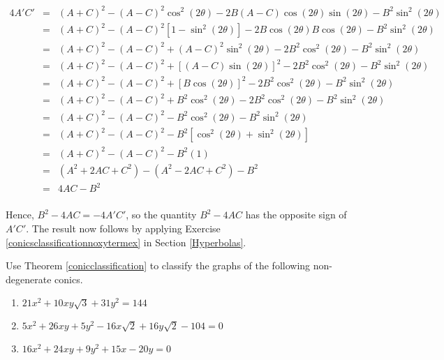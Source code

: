 \documentclass{ximera}
\begin{document}
{\[\begin{array}{rcl}
4A'C' & = & (A+C)^2 - (A-C)^2 \cos^{2}(2\theta) -2B(A-C)\cos(2\theta)\sin(2\theta) -B^2\sin^2(2\theta) \\ [3pt]
      & = & (A+C)^2 - (A-C)^2 \left[ 1-\sin^{2}(2\theta)\right] -2B\cos(2\theta) B \cos(2\theta) -B^2\sin^2(2\theta) \\ [3pt]
      & = & (A+C)^2 - (A-C)^2  + (A-C)^2 \sin^{2}(2\theta) -2B^2\cos^{2}(2\theta) -B^2\sin^2(2\theta) \\ [3pt]   
      & = & (A+C)^2 - (A-C)^2  +\left[(A-C) \sin(2\theta)\right]^2 -2B^2\cos^{2}(2\theta) -B^2\sin^2(2\theta)  \\ [3pt]    
      & = & (A+C)^2 - (A-C)^2  +\left[B \cos(2\theta)\right]^2 -2B^2\cos^{2}(2\theta) -B^2\sin^2(2\theta)  \\ [3pt]      
      & = & (A+C)^2 - (A-C)^2  +B^2\cos^{2}(2\theta) -2B^2\cos^{2}(2\theta) -B^2\sin^2(2\theta)  \\ [3pt]   
      & = & (A+C)^2 - (A-C)^2  -B^2\cos^{2}(2\theta) -B^2\sin^2(2\theta)  \\ [3pt] 
		  & = & (A+C)^2 - (A-C)^2  -B^2\left[\cos^{2}(2\theta)+ \sin^2(2\theta)\right]  \\ [3pt]  
		  & = & (A+C)^2 - (A-C)^2  -B^2 (1) \\ [3pt] 
	  	& = & \left(A^2 + 2AC+C^2\right) - \left(A^2 - 2AC+C^2\right)  -B^2  \\ [3pt] 			    			
	  	& = & 4AC  -B^2  \\ [3pt] 		
\end{array} \]

Hence, $B^2 - 4AC = -4 A'C'$, so the quantity $B^2 - 4AC$ has the opposite sign of $A'C'$.  The result now follows by applying  Exercise \ref{conicsclassificationnoxytermex} in Section \ref{Hyperbolas}.

\begin{example} \label{conicdiscex}  Use Theorem \ref{conicclassification} to classify the graphs of the following non-degenerate conics.

\begin{enumerate}

\item   $21x^2+10xy\sqrt{3}+31y^2=144$  

\item   $5x^2+26xy+5y^2-16x\sqrt{2}+16y\sqrt{2}-104 = 0$  

\item   $16x^2+24xy+9y^2 +15x-20y = 0$  

\end{enumerate}


\end{example}}
\end{document}
